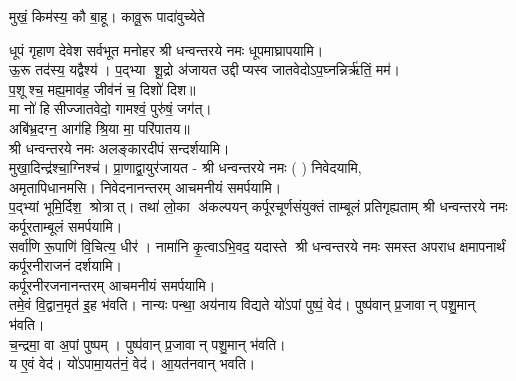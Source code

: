   
\begin{center}

{मुखं॒ किम॑स्य॒ कौ बा॒हू। कावू॒रू पादा॑वुच्येते}

{धूपं गृहाण देवेश सर्वभूत मनोहर}
श्री धन्वन्तरये नमः धूपमाघ्रापयामि।\\
 
{ऊ॒रू तद॑स्य॒ यद्वैश्य॑। प॒द्भ्या शू॒द्रो अ॑जायत}
उद्दीप्यस्व जातवेदोऽप॒घ्नन्निर्ऋ॑तिं॒ मम॑।\\
 प॒शूश्च॒ मह्य॒माव॑ह॒ जीव॑नं च॒ दिशो॑ दिश॥ \\
मा नो॑ हिसीज्जातवेदो॒ गामश्वं॒ पुरु॑षं॒ जग॑त्।\\
अबि॑भ्र॒दग्न॒ आग॑हि श्रि॒या मा॒ परि॑पातय॥ \\
श्री धन्वन्तरये नमः अलङ्कारदीपं सन्दर्शयामि।\\

 {मुखा॒दिन्द्र॑श्चा॒ग्निश्च॑। प्रा॒णाद्वा॒युर॑जायत}
- श्री धन्वन्तरये नमः (	) निवेदयामि, \\
अमृतापिधानमसि। निवेदनानन्तरम् आचमनीयं समर्पयामि।\\


{प॒द्भ्यां भूमि॒र्दिश॒ श्रोत्रात्। तथा॑ लो॒का अ॑कल्पयन्}
{कर्पूरचूर्णसंयुक्तं ताम्बूलं प्रतिगृह्यताम्}
श्री धन्वन्तरये नमः कर्पूरताम्बूलं समर्पयामि।\\

{सर्वा॑णि रू॒पाणि॑ वि॒चित्य॒ धीर॑। नामा॑नि कृ॒त्वाऽभि॒वद॒\an{} यदास्ते}
श्री धन्वन्तरये नमः समस्त अपराध क्षमापनार्थं कर्पूरनीराजनं दर्शयामि।\\
कर्पूरनीरजनानन्तरम् आचमनीयं समर्पयामि।\\

 {तमे॒वं वि॒द्वान॒मृत॑ इ॒ह भ॑वति। नान्यः पन्था॒ अय॑नाय विद्यते}
 यो॑ऽपां पुष्पं॒ वेद॑। पुष्प॑वान् प्र॒जावान् पशु॒मान् भ॑वति।\\
च॒न्द्रमा॒ वा अ॒पां पुष्पम्। पुष्प॑वान् प्र॒जावान् पशु॒मान् भ॑वति।\\
य ए॒वं वेद॑। यो॑ऽपामा॒यत॑नं॒ वेद॑। आ॒यत॑नवान् भवति।\\


\end{center}
